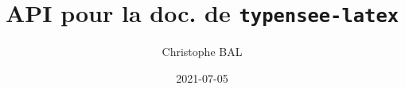 \documentclass[12pt,a4paper]{article}
\begin{document}
\title{%
	API pour la doc. de \texttt{typensee-latex}
}
\author{Christophe BAL}
\date{2021-07-05}

\maketitle

\tableofcontents

\newpage













\end{document}
